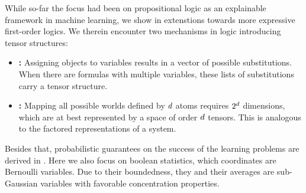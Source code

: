 While so-far the focus had been on propositional logic as an explainable framework in machine learning, we show in  extenstions towards more expressive first-order logics.
We therein encounter two mechanisms in logic introducing tensor structures:
\begin{itemize}
    \item \textbf{\SubstitutionStructure:} Assigning objects to variables results in a vector of possible substitutions. When there are formulas with multiple variables, these lists of substitutions carry a tensor structure.
    \item \textbf{\WorldStructure:} Mapping all possible worlds defined by $d$ atoms requires $2^{d}$ dimensions, which are at best represented by a space of order $d$ tensors.
    This is analogous to the factored representations of a system.
\end{itemize}


Besides that, probabilistic guarantees on the success of the learning problems are derived in .
Here we also focus on boolean statistics, which coordinates are Bernoulli variables.
Due to their boundedness, they and their averages are sub-Gaussian variables with favorable concentration properties.